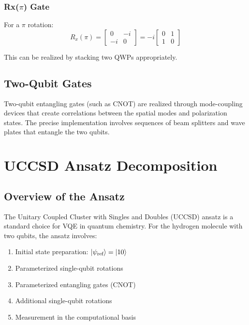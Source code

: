 \documentclass[
	a4paper,
	12pt,
	oneside,
]{article}
\begin{document}
\subsubsection{Rx(\(\pi\)) Gate}

For a $\pi$ rotation:
\begin{equation}
R_x(\pi) = \begin{bmatrix}
	0 & -i \\
	-i & 0
\end{bmatrix} = -i \begin{bmatrix}
	0 & 1 \\
	1 & 0
\end{bmatrix}
\end{equation}

This can be realized by stacking two QWPs appropriately.

\subsection{Two-Qubit Gates}

Two-qubit entangling gates (such as CNOT) are realized through mode-coupling devices that create correlations between the spatial modes and polarization states. The precise implementation involves sequences of beam splitters and wave plates that entangle the two qubits.


\section{UCCSD Ansatz Decomposition}

\subsection{Overview of the Ansatz}

The Unitary Coupled Cluster with Singles and Doubles (UCCSD) ansatz is a standard choice for VQE in quantum chemistry. For the hydrogen molecule with two qubits, the ansatz involves:
\begin{enumerate}
	\item Initial state preparation: $\ket{\psi_{\text{ref}}} = \ket{10}$
	\item Parameterized single-qubit rotations
	\item Parameterized entangling gates (CNOT)
	\item Additional single-qubit rotations
	\item Measurement in the computational basis
\end{enumerate}
\end{document}
